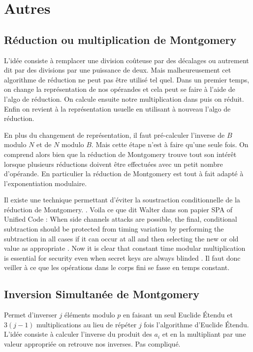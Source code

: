 \section{Autres}
\subsection{Réduction ou multiplication de Montgomery}
L'idée consiste à remplacer une division coûteuse par des décalages ou autrement dit par des divisions par une puissance de deux. Mais malheureusement cet algorithme de réduction ne peut pas être utilisé tel quel. Dans un premier temps, on change la représentation de nos opérandes et cela peut se faire à l'aide de l'algo de réduction. On calcule ensuite notre multiplication dans \Z puis on réduit. Enfin on revient à la représentation usuelle en utilisant à nouveau l'algo de réduction. 

En plus du changement de représentation, il faut pré-calculer l'inverse de $B$ modulo $N$ et de $N$ modulo $B$. Mais cette étape n'est à faire qu'une seule fois. On comprend alors bien que la réduction de Montgomery trouve tout son intérêt lorsque plusieurs réductions doivent être effectuées avec un petit nombre d'opérande. En particulier la réduction de Montgomery est tout à fait adapté à l'exponentiation modulaire. 

Il existe une technique permettant d'éviter la soustraction conditionnelle de la réduction de Montgomery. . Voila ce que dit Walter dans son papier SPA of Unified Code : \og{} When side channels attacks are possible, the final, conditional subtraction should be protected from timing variation by performing the subtraction in all cases if it can occur at all and then selecting the new or old value as appropriate \fg{}. \og{} Now it is clear that constant time modular multiplication is essential for security even when secret keys are always blinded \fg{}. Il faut donc veiller à ce que les opérations dans le corps fini se fasse en temps constant.

\subsection{Inversion Simultanée de Montgomery}
Permet d'inverser $j$ éléments modulo $p$ en faisant un seul Euclide \'Etendu et $3(j-1)$ multiplications au lieu de répéter $j$ fois l'algorithme d'Euclide \'Etendu. L'idée consiste à calculer l'inverse du produit des $a_i$ et en la multipliant par une valeur appropriée on retrouve nos inverses. Pas compliqué.

